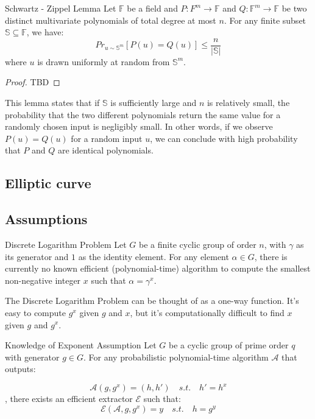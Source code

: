 \documentclass{article}
\begin{document}
\begin{lemma}{Schwartz - Zippel Lemma}{}
Let $\mathbb{F}$ be a field and $P: F^m \rightarrow \mathbb{F}$ and $Q: \mathbb{F}^m \rightarrow \mathbb{F}$ be two distinct multivariate polynomials of total degree at most $n$. For any finite subset $\mathbb{S} \subseteq \mathbb{F}$, we have:
        \begin{equation}
            Pr_{u \sim \mathbb{S}^{m}}[P(u) = Q(u)] \leq \frac{n}{|\mathbb{S}|}
        \end{equation}
where $u$ is drawn uniformly at random from $\mathbb{S}^m$.
\end{lemma}

\begin{proof}
    TBD
\end{proof}

This lemma states that if $\mathbb{S}$ is sufficiently large and $n$ is relatively small, the probability that the two different polynomials return the same value for a randomly chosen input is negligibly small. In other words, if we observe $P(u) = Q(u)$ for a random input $u$, we can conclude with high probability that $P$ and $Q$ are identical polynomials.

\subsection{Elliptic curve}

\subsection{Assumptions}

\begin{assumption}{Discrete Logarithm Problem}{} Let $G$ be a finite cyclic group of order $n$, with $\gamma$ as its generator and $1$ as the identity element. For any element $\alpha \in G$, there is currently no known efficient (polynomial-time) algorithm to compute the smallest non-negative integer $x$ such that $\alpha = \gamma^{x}$.
\end{assumption}

The Discrete Logarithm Problem can be thought of as a one-way function. It's easy to compute $g^{x}$ given $g$ and $x$, but it's computationally difficult to find $x$ given $g$ and $g^{x}$.

\begin{assumption}{Knowledge of Exponent Assumption}{}
Let $G$ be a cyclic group of prime order $q$ with generator $g \in G$. For any probabilistic polynomial-time algorithm $\mathcal{A}$ that outputs:

\begin{equation}
\mathcal{A}(g, g^x) = (h, h') \quad s.t. \quad h' = h^x
\end{equation}
, there exists an efficient extractor $\mathcal{E}$ such that:
\begin{equation}
\mathcal{E}(\mathcal{A}, g, g^x) = y \quad s.t. \quad h = g^y
\end{equation}
\end{assumption}
\end{document}
